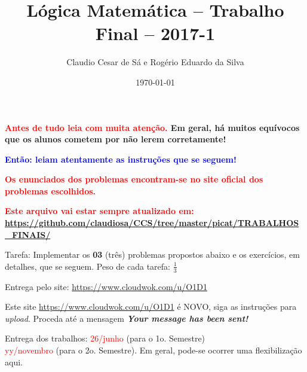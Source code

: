\documentclass[a4paper,12pt]{article}
\title{Lógica Matemática -- Trabalho Final -- 2017-1}
\author{Claudio Cesar de Sá e Rogério Eduardo da Silva}
\date{\today}
\begin{document}
\maketitle

\begin{flushleft}


\vspace{0.5cm}
  {\bf \textcolor{red}{
Antes de tudo leia com \textbf{muita atenção}.} Em geral, há muitos equívocos
que os alunos cometem por não lerem corretamente!}


\vspace{0.5cm}
 {\bf \textcolor{blue}{Então: leiam atentamente as
instruções que se seguem!}}


\vspace{0.5cm}
  {\bf \textcolor{red}{Os enunciados dos problemas encontram-se no site oficial dos problemas escolhidos.}}


\vspace{0.5cm}
  {\bf \textcolor{red}{Este arquivo vai estar sempre atualizado em: }}\\
{\bf \textcolor{red}{\url{https://github.com/claudiosa/CCS/tree/master/picat/TRABALHOS_FINAIS/}}}




\vspace{0.5cm}
 Tarefa: Implementar os  \textbf{03} (três)   problemas propostos abaixo e os exercícios, em detalhes, que se seguem. Peso de cada tarefa: $\frac{1}{3}$


\vspace{0.5cm}
 Entrega pelo site: \textcolor{red}{\url{https://www.cloudwok.com/u/O1D1}}


\vspace{0.5cm}
  Este site  \textcolor{red}{\url{https://www.cloudwok.com/u/O1D1}} é NOVO, siga as instruções para \emph{upload}. Proceda até
a mensagem \textbf{ \emph{Your message has been sent!}}

\vspace{0.5cm}
 Entrega dos trabalhos: \textcolor{red}{26/junho} (para o 1o. Semestre)\\
\textcolor{red}{yy/novembro} (para o 2o. Semestre). Em geral, pode-se
ocorrer uma flexibilização aqui.\\




\end{flushleft}
\end{document}
